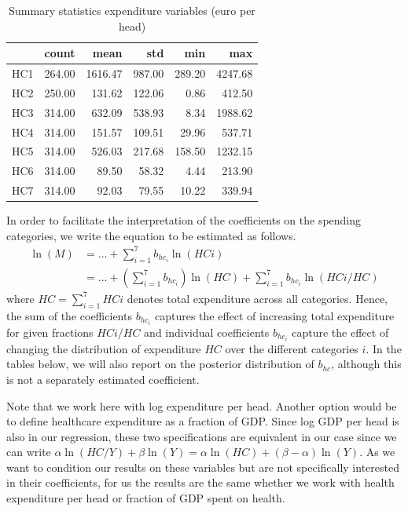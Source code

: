 \documentclass{article}
\begin{document}
\begin{table}[htbp]
\caption{\label{tab:org7a5d935}Summary statistics expenditure variables (euro per head)}
\centering
\begin{tabular}{lrrrrr}
 & count & mean & std & min & max\\
\hline
HC1 & 264.00 & 1616.47 & 987.00 & 289.20 & 4247.68\\
HC2 & 250.00 & 131.62 & 122.06 & 0.86 & 412.50\\
HC3 & 314.00 & 632.09 & 538.93 & 8.34 & 1988.62\\
HC4 & 314.00 & 151.57 & 109.51 & 29.96 & 537.71\\
HC5 & 314.00 & 526.03 & 217.68 & 158.50 & 1232.15\\
HC6 & 314.00 & 89.50 & 58.32 & 4.44 & 213.90\\
HC7 & 314.00 & 92.03 & 79.55 & 10.22 & 339.94\\
\end{tabular}
\end{table}

In order to facilitate the interpretation of the coefficients on the spending categories, we write the equation to be estimated as follows.
\begin{align}
\label{eq:17}
\ln(M) &= ... + \sum_{i=1}^7 b_{hc_i} \ln(HCi) \\
\label{eq:18}
 &= ... + \left(\sum_{i=1}^7 b_{hc_i} \right) \ln(HC) +  \sum_{i=1}^7 b_{hc_i} \ln(HCi/HC) 
\end{align}
where \(HC =  \sum_{i=1}^7 HCi\) denotes total expenditure across all categories. Hence, the sum of the coefficients \(b_{hc_i}\) captures the effect of increasing total expenditure for given fractions \(HCi/HC\) and individual coefficients \(b_{hc_i}\) capture the effect of changing the distribution of expenditure \(HC\) over the different categories \(i\). In the tables below, we will also report on the posterior distribution of \(b_{hc}\), although this is not a separately estimated coefficient.

Note that we work here with log expenditure per head. Another option would be to define healthcare expenditure as a fraction of GDP. Since log GDP per head is also in our regression, these two specifications are equivalent in our case since we can write \(\alpha \ln(HC/Y) + \beta \ln(Y) = \alpha \ln(HC) + (\beta-\alpha) \ln(Y)\). As we want to condition our results on these variables but are not specifically interested in their coefficients, for us the results are the same whether we work with health expenditure per head or fraction of GDP spent on health.
\end{document}
